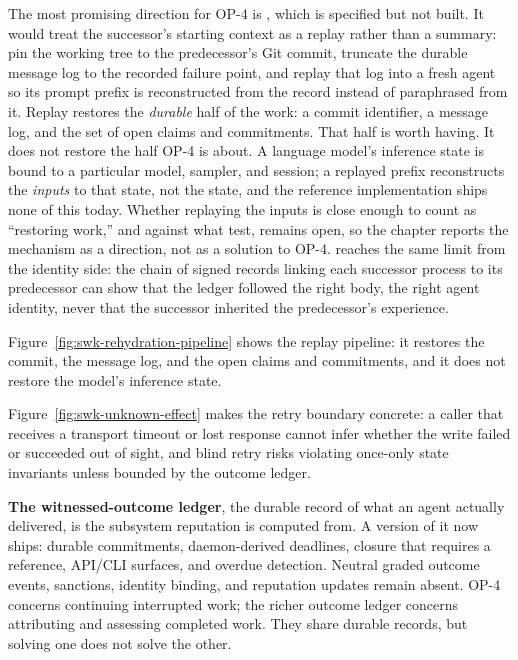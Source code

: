\documentclass[11pt,a4paper]{article}
\theoremstyle{definition}
\theoremstyle{remark}
\begin{document}
The most promising direction for OP-4 is ,
which is specified but not built. It would treat the successor's starting
context as a replay rather than a summary: pin the working tree to the
predecessor's Git commit, truncate the durable message log to the recorded failure
point, and replay that log into a fresh agent so its prompt prefix is reconstructed
from the record instead of paraphrased from it. Replay restores the
\emph{durable} half of the work: a commit identifier, a message log, and the
set of open claims and commitments. That half is worth having. It does not
restore the half OP-4 is about. A language model's inference state is bound
to a particular model, sampler, and session; a replayed prefix reconstructs the
\emph{inputs} to that state, not the state, and the reference implementation ships
none of this today. Whether replaying the inputs is close enough to count as
``restoring work,'' and against what test, remains open, so the chapter reports
the mechanism as a direction, not as a solution to OP-4.
 reaches the same limit from the identity
side: the chain of signed records linking each successor process to its
predecessor can show that the ledger followed the right body,
the right agent identity, never that the successor inherited the predecessor's experience.



Figure~\ref{fig:swk-rehydration-pipeline} shows the replay pipeline: it
restores the commit, the message log, and the open claims and commitments, and
it does not restore the model's inference state.

Figure~\ref{fig:swk-unknown-effect} makes the retry boundary concrete: a
caller that receives a transport timeout or lost response cannot infer
whether the write failed or succeeded out of sight, and blind retry risks
violating once-only state invariants unless bounded by the outcome ledger.



\textbf{The witnessed-outcome ledger}, the durable record of what an agent
actually delivered, is the subsystem reputation is computed from. A \BuiltWeak{}
version of it now ships: durable commitments, daemon-derived deadlines, closure
that requires a reference, API/CLI surfaces, and overdue detection. Neutral graded outcome events,
sanctions, identity binding, and reputation updates remain absent. OP-4 concerns continuing interrupted work; the richer outcome ledger
concerns attributing and assessing completed work. They share durable records,
but solving one does not solve the other.
\end{document}
